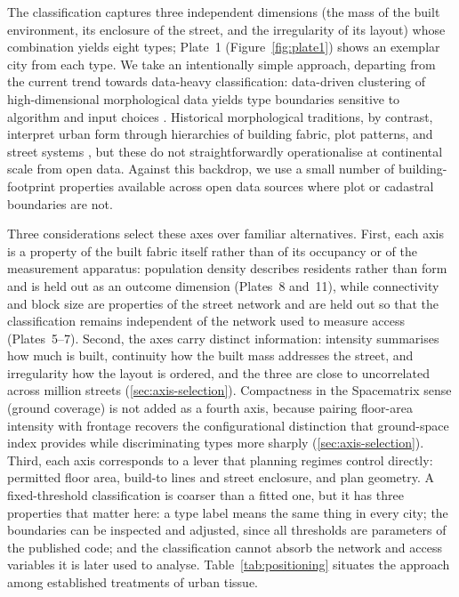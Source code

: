 \documentclass[review,authoryear]{elsarticle}
\begin{document}
The classification captures three independent dimensions (the mass of the built environment, its enclosure of the street, and the irregularity of its layout) whose combination yields eight types; Plate~1 (Figure~\ref{fig:plate1}) shows an exemplar city from each type. We take an intentionally simple approach, departing from the current trend towards data-heavy classification: data-driven clustering of high-dimensional morphological data yields type boundaries sensitive to algorithm and input choices \citep{berghauser2019systematic, fleischmann2022morphological}. Historical morphological traditions, by contrast, interpret urban form through hierarchies of building fabric, plot patterns, and street systems \citep{whitehand2001british, kropf2009aspects}, but these do not straightforwardly operationalise at continental scale from open data. Against this backdrop, we use a small number of building-footprint properties available across open data sources where plot or cadastral boundaries are not.

Three considerations select these axes over familiar alternatives. First, each axis is a property of the built fabric itself rather than of its occupancy or of the measurement apparatus: population density describes residents rather than form and is held out as an outcome dimension (Plates~8 and~11), while connectivity and block size are properties of the street network and are held out so that the classification remains independent of the network used to measure access (Plates~5--7). Second, the axes carry distinct information: intensity summarises how much is built, continuity how the built mass addresses the street, and irregularity how the layout is ordered, and the three are close to uncorrelated across \nClassifiedM{} million streets (\ref{sec:axis-selection}). Compactness in the Spacematrix sense (ground coverage) is not added as a fourth axis, because pairing floor-area intensity with frontage recovers the configurational distinction that ground-space index provides while discriminating types more sharply (\ref{sec:axis-selection}). Third, each axis corresponds to a lever that planning regimes control directly: permitted floor area, build-to lines and street enclosure, and plan geometry. A fixed-threshold classification is coarser than a fitted one, but it has three properties that matter here: a type label means the same thing in every city; the boundaries can be inspected and adjusted, since all thresholds are parameters of the published code; and the classification cannot absorb the network and access variables it is later used to analyse. Table~\ref{tab:positioning} situates the approach among established treatments of urban tissue.
\end{document}
